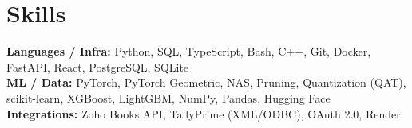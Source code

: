 \documentclass[10pt,letterpaper]{article}
\begin{document}
\section{Skills}
\textbf{Languages / Infra:} Python, SQL, TypeScript, Bash, C++, Git, Docker, FastAPI, React, PostgreSQL, SQLite\\
\textbf{ML / Data:} PyTorch, PyTorch Geometric, NAS, Pruning, Quantization (QAT), scikit-learn, XGBoost, LightGBM, NumPy, Pandas, Hugging Face\\
\textbf{Integrations:} Zoho Books API, TallyPrime (XML/ODBC), OAuth 2.0, Render
\end{document}

